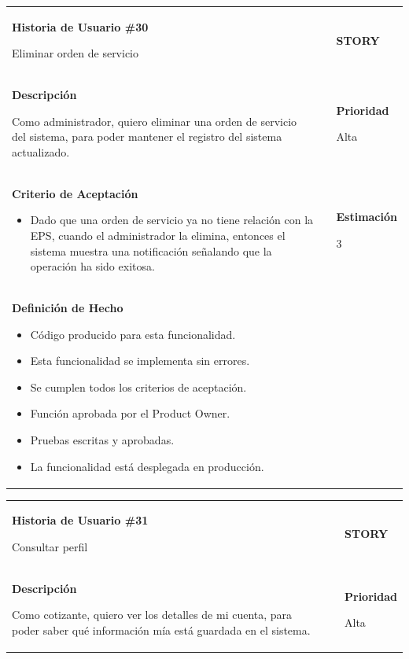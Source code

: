 \documentclass[12pt,a4paper]{article}
\begin{document}
\begin{center}
\begin{tabular}{| p{10cm} c p{2.5cm}|}
\hline 
\textbf{Historia de Usuario \#30}

Eliminar orden de servicio & & \textbf{{\Large STORY}} \\ 
\textbf{Descripción}

Como administrador, quiero eliminar una orden de servicio del sistema, para
poder mantener el registro del sistema actualizado. &  & \textbf{Prioridad}

Alta\\

\textbf{Criterio de Aceptación}

\begin{itemize}
\item Dado que una orden de servicio ya no tiene relación con la EPS, cuando el
administrador la elimina, entonces el sistema muestra una
notificación señalando que la operación ha sido exitosa.
\end{itemize} & & \textbf{Estimación}

3 \\ 

\textbf{Definición de Hecho}

\begin{itemize}
\item Código producido para esta funcionalidad.
\item Esta funcionalidad se implementa sin errores.
\item Se cumplen todos los criterios de aceptación.
\item Función aprobada por el Product Owner.
\item Pruebas escritas y aprobadas.
\item La funcionalidad está desplegada en producción.
\end{itemize} & & \\
\hline  
\end{tabular}
\vspace{5mm}

\begin{tabular}{| p{10cm} c p{2.5cm}|}
\hline 
\textbf{Historia de Usuario \#31}

Consultar perfil & & \textbf{{\Large STORY}} \\ 
\textbf{Descripción}

Como cotizante, quiero ver los detalles de mi cuenta, para poder saber
qué información mía está guardada en el sistema. &  & \textbf{Prioridad}

Alta\\


\end{tabular}
\end{center}
\end{document}
